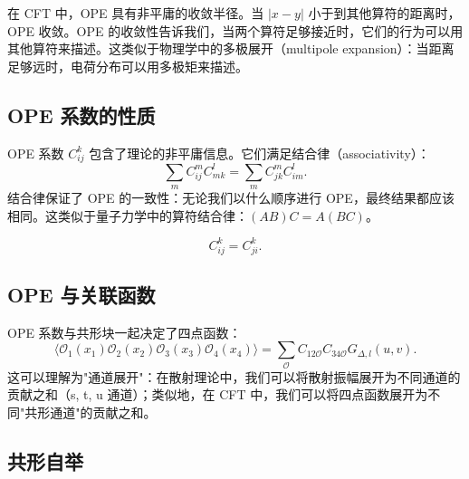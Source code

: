 \begin{remark}
在 CFT 中，OPE 具有非平庸的收敛半径。当 $|x-y|$ 小于到其他算符的距离时，OPE 收敛。OPE 的收敛性告诉我们，当两个算符足够接近时，它们的行为可以用其他算符来描述。这类似于物理学中的多极展开（multipole expansion）：当距离足够远时，电荷分布可以用多极矩来描述。
\end{remark}

\subsection{OPE 系数的性质}

\begin{property}
OPE 系数 $C_{ij}^k$ 包含了理论的非平庸信息。它们满足结合律（associativity）：
\begin{equation}
    \sum_m C_{ij}^m C_{mk}^l = \sum_m C_{jk}^m C_{im}^l.
\end{equation}
结合律保证了 OPE 的一致性：无论我们以什么顺序进行 OPE，最终结果都应该相同。这类似于量子力学中的算符结合律：$(AB)C = A(BC)$。
\end{property}

\begin{property}
\begin{equation}
    C_{ij}^k = C_{ji}^k.
\end{equation}
\end{property}

\subsection{OPE 与关联函数}

\begin{theorem}
OPE 系数与共形块一起决定了四点函数：
\begin{equation}
    \langle \mathcal{O}_1(x_1) \mathcal{O}_2(x_2) \mathcal{O}_3(x_3) \mathcal{O}_4(x_4) \rangle = \sum_{\mathcal{O}} C_{12\mathcal{O}} C_{34\mathcal{O}} G_{\Delta, l}(u, v).
\end{equation}
这可以理解为"通道展开"：在散射理论中，我们可以将散射振幅展开为不同通道的贡献之和（s, t, u 通道）；类似地，在 CFT 中，我们可以将四点函数展开为不同"共形通道"的贡献之和。
\end{theorem}

\subsection{共形自举}

